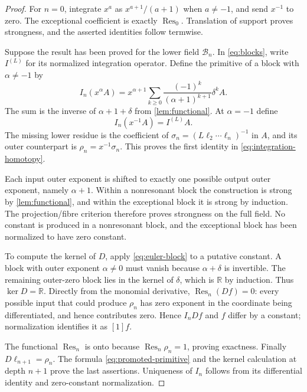 \documentclass[11pt,a4paper]{article}
\numberwithin{equation}{section}
\theoremstyle{definition}
\theoremstyle{remark}
\newcommand{\R}{\mathbb R}
\newcommand{\Res}{\operatorname{Res}}
\begin{document}
\begin{proof}
For $n=0$, integrate $x^a$ as $x^{a+1}/(a+1)$ when $a\ne-1$, and send $x^{-1}$ to zero. The exceptional coefficient is exactly $\Res_0$. Translation of support proves strongness, and the asserted identities follow termwise.

Suppose the result has been proved for the lower field $\mathcal B_n$. In \eqref{eq:blocks}, write $I^{(L)}$ for its normalized integration operator. Define the primitive of a block with $\alpha\ne-1$ by
\begin{equation}
 I_n(x^\alpha A)=x^{\alpha+1}
 \sum_{k\ge0}\frac{(-1)^k}{(\alpha+1)^{k+1}}\delta^kA.
 \label{eq:nonresonant-integral}
\end{equation}
The sum is the inverse of $\alpha+1+\delta$ from \cref{lem:functional}. At $\alpha=-1$ define
\[
 I_n(x^{-1}A)=I^{(L)}A.
\]
The missing lower residue is the coefficient of
$\sigma_n=(L\ell_2\cdots\ell_n)^{-1}$ in $A$, and its outer counterpart is $\rho_n=x^{-1}\sigma_n$. This proves the first identity in \eqref{eq:integration-homotopy}.

Each input outer exponent is shifted to exactly one possible output outer exponent, namely $\alpha+1$. Within a nonresonant block the construction is strong by \cref{lem:functional}, and within the exceptional block it is strong by induction. The projection/fibre criterion therefore proves strongness on the full field. No constant is produced in a nonresonant block, and the exceptional block has been normalized to have zero constant.

To compute the kernel of $D$, apply \eqref{eq:euler-block} to a putative constant. A block with outer exponent $\alpha\ne0$ must vanish because $\alpha+\delta$ is invertible. The remaining outer-zero block lies in the kernel of $\delta$, which is $\R$ by induction. Thus $\ker D=\R$. Directly from the monomial derivative, $\Res_n(Df)=0$: every possible input that could produce $\rho_n$ has zero exponent in the coordinate being differentiated, and hence contributes zero. Hence $I_nDf$ and $f$ differ by a constant; normalization identifies it as $[1]f$.

The functional $\Res_n$ is onto because $\Res_n\rho_n=1$, proving exactness. Finally $D\ell_{n+1}=\rho_n$. The formula \eqref{eq:promoted-primitive} and the kernel calculation at depth $n+1$ prove the last assertions. Uniqueness of $I_n$ follows from its differential identity and zero-constant normalization.
\end{proof}
\end{document}
